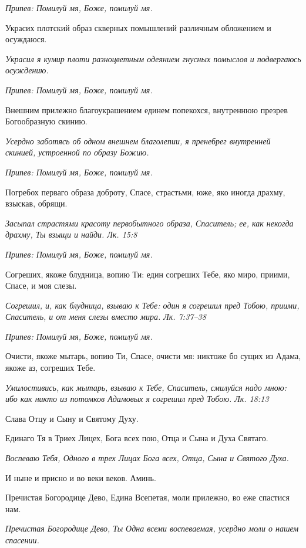 \itshape Припев:\normalfont{} Помилуй мя, Боже, помилуй мя.


Украсих плотский образ скверных помышлений различным обложением и осуждаюся.


\itshape Украсил я кумир плоти разноцветным одеянием гнусных помыслов и подвергаюсь осуждению.\normalfont{}


\itshape Припев:\normalfont{} Помилуй мя, Боже, помилуй мя.


Внешним прилежно благоукрашением единем попекохся, внутреннюю презрев Богообразную скинию.


\itshape Усердно заботясь об одном внешнем благолепии, я пренебрег внутренней скинией, устроенной по образу Божию.\normalfont{}


\itshape Припев:\normalfont{} Помилуй мя, Боже, помилуй мя.


Погребох перваго образа доброту, Спасе, страстьми, юже, яко иногда драхму, взыскав, обрящи.


\itshape Засыпал страстями красоту первобытного образа, Спаситель; ее, как некогда драхму, Ты взыщи и найди. Лк. 15:8\normalfont{}


\itshape Припев:\normalfont{} Помилуй мя, Боже, помилуй мя.


Согреших, якоже блудница, вопию Ти: един согреших Тебе, яко миро, приими, Спасе, и моя слезы.


\itshape Согрешил, и, как блудница, взываю к Тебе: один я согрешил пред Тобою, приими, Спаситель, и от меня слезы вместо мира. Лк. 7:37–38\normalfont{}


\itshape Припев:\normalfont{} Помилуй мя, Боже, помилуй мя.


Очисти, якоже мытарь, вопию Ти, Спасе, очисти мя: никтоже бо сущих из Адама, якоже аз, согреших Тебе.


\itshape Умилостивись, как мытарь, взываю к Тебе, Спаситель, смилуйся надо мною: ибо как никто из потомков Адамовых я согрешил пред Тобою. Лк. 18:13\normalfont{}


Слава Отцу и Сыну и Святому Духу.


Единаго Тя в Триех Лицех, Бога всех пою, Отца и Сына и Духа Святаго.


\itshape Воспеваю Тебя, Одного в трех Лицах Бога всех, Отца, Сына и Святого Духа.\normalfont{}


И ныне и присно и во веки веков. Аминь.


Пречистая Богородице Дево, Едина Всепетая, моли прилежно, во еже спастися нам.


\itshape Пречистая Богородице Дево, Ты Одна всеми воспеваемая, усердно моли о нашем спасении.\normalfont{}





